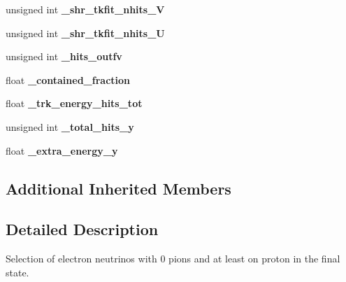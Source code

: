 \begin{DoxyCompactItemize}
\item 
\hypertarget{classselection_1_1CC0piNpSelection_adab23c54dd799cdf83c31a10e4ae9061}{unsigned int {\bfseries \-\_\-shr\-\_\-tkfit\-\_\-nhits\-\_\-\-V}}\label{classselection_1_1CC0piNpSelection_adab23c54dd799cdf83c31a10e4ae9061}

\item 
\hypertarget{classselection_1_1CC0piNpSelection_a6c75f5783174133ce97849f128f3dee3}{unsigned int {\bfseries \-\_\-shr\-\_\-tkfit\-\_\-nhits\-\_\-\-U}}\label{classselection_1_1CC0piNpSelection_a6c75f5783174133ce97849f128f3dee3}

\item 
\hypertarget{classselection_1_1CC0piNpSelection_ac39ec79d190fb925f8d20b03cbeb0605}{unsigned int {\bfseries \-\_\-hits\-\_\-outfv}}\label{classselection_1_1CC0piNpSelection_ac39ec79d190fb925f8d20b03cbeb0605}

\item 
\hypertarget{classselection_1_1CC0piNpSelection_a8e7933222bce1424aee24bae8dcf4864}{float {\bfseries \-\_\-contained\-\_\-fraction}}\label{classselection_1_1CC0piNpSelection_a8e7933222bce1424aee24bae8dcf4864}

\item 
\hypertarget{classselection_1_1CC0piNpSelection_a82a48c6128c34252642d237b98f1b66a}{float {\bfseries \-\_\-trk\-\_\-energy\-\_\-hits\-\_\-tot}}\label{classselection_1_1CC0piNpSelection_a82a48c6128c34252642d237b98f1b66a}

\item 
\hypertarget{classselection_1_1CC0piNpSelection_a819d1d973e74bcd2ad82aa01ea24ac37}{unsigned int {\bfseries \-\_\-total\-\_\-hits\-\_\-y}}\label{classselection_1_1CC0piNpSelection_a819d1d973e74bcd2ad82aa01ea24ac37}

\item 
\hypertarget{classselection_1_1CC0piNpSelection_a2e386c361ecc27d22ff2642e80a629e4}{float {\bfseries \-\_\-extra\-\_\-energy\-\_\-y}}\label{classselection_1_1CC0piNpSelection_a2e386c361ecc27d22ff2642e80a629e4}

\end{DoxyCompactItemize}
\subsection*{Additional Inherited Members}


\subsection{Detailed Description}
Selection of electron neutrinos with 0 pions and at least on proton in the final state. 

